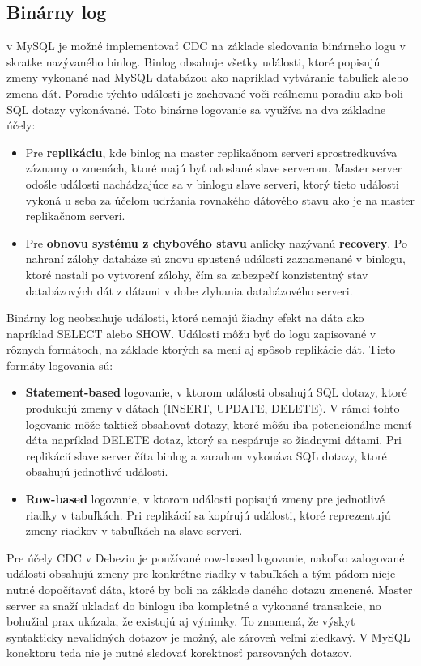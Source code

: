 \subsection{Binárny log} \label{mysql:binlog}
v MySQL je možné implementovať CDC na základe sledovania binárneho logu v skratke nazývaného binlog\cite{mysql:reference_manual}. Binlog obsahuje všetky události, ktoré popisujú zmeny vykonané nad MySQL databázou ako napríklad vytváranie tabuliek alebo zmena dát. Poradie týchto události je zachované voči reálnemu poradiu ako boli SQL dotazy vykonávané. Toto binárne logovanie sa využíva na dva základne účely:
\begin{itemize}
\item Pre \textbf{replikáciu}, kde binlog na master replikačnom serveri sprostredkuváva záznamy o zmenách, ktoré majú byť odoslané slave serverom. Master server odošle události nachádzajúce sa v binlogu slave serveri, ktorý tieto události vykoná u seba za účelom udržania rovnakého dátového stavu ako je na master replikačnom serveri.
\item Pre \textbf{obnovu systému z chybového stavu} anlicky nazývanú \textbf{recovery}. Po  nahraní zálohy databáze sú znovu spustené události zaznamenané v binlogu, ktoré nastali po vytvorení zálohy, čím sa zabezpečí konzistentný stav databázových dát z dátami v dobe zlyhania databázového serveri.
\end{itemize}

Binárny log neobsahuje události, ktoré nemajú žiadny efekt na dáta ako napríklad  SELECT alebo SHOW. Události môžu byť do logu zapisované v rôznych formátoch, na základe ktorých sa mení aj spôsob replikácie dát. Tieto formáty logovania sú:
\begin{itemize}
\item \textbf{Statement-based} logovanie, v ktorom události obsahujú SQL dotazy, ktoré produkujú zmeny v dátach (INSERT, UPDATE, DELETE). V rámci tohto logovanie môže taktiež obsahovať dotazy, ktoré môžu iba potencionálne meniť dáta napríklad DELETE dotaz, ktorý sa nespáruje so žiadnymi dátami. Pri replikácií slave server číta binlog a zaradom vykonáva SQL dotazy, ktoré obsahujú jednotlivé události.
\item \textbf{Row-based} logovanie, v ktorom události popisujú zmeny pre jednotlivé riadky v tabuľkách. Pri replikácií sa kopírujú události, ktoré reprezentujú zmeny riadkov v tabuľkách na slave serveri. 
\end{itemize}

Pre účely CDC v Debeziu je používané row-based logovanie, nakoľko zalogované události obsahujú zmeny pre konkrétne riadky v tabuľkách a tým pádom nieje nutné dopočítavať dáta, ktoré by boli na základe daného dotazu zmenené. Master server sa snaží ukladať do binlogu iba kompletné a vykonané transakcie, no bohužial prax ukázala, že existujú aj výnimky. To znamená, že výskyt syntakticky nevalidných dotazov je možný, ale zároveň veľmi ziedkavý. V MySQL konektoru teda nie je nutné sledovať korektnosť parsovaných dotazov.

